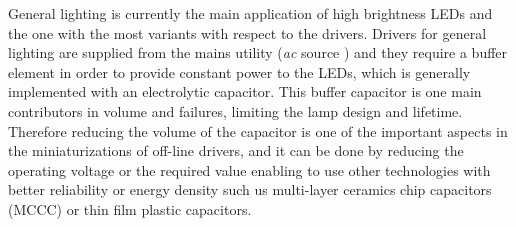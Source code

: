 General lighting is currently the main application of high brightness LEDs and the one with the most variants with respect to the drivers. Drivers for general lighting are supplied from the mains utility (\emph{ac} source ) and they require a buffer element in order to provide constant power to the LEDs, which is generally implemented with an electrolytic capacitor. This buffer capacitor is one main contributors in volume and failures, limiting the lamp design and lifetime. Therefore reducing the volume of the capacitor is one of the important aspects in the miniaturizations of off-line drivers, and it can be done by reducing the operating voltage or the required value enabling to use other technologies with better reliability or energy density such us multi-layer ceramics chip capacitors (MCCC) or  thin film plastic capacitors.

